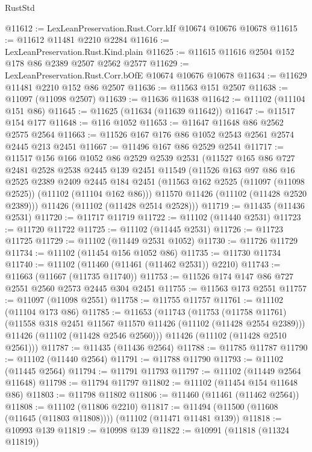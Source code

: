 \begin{lexlean}{RustStd}
\begin{coremodule}
@11612 := LexLeanPreservation.Rust.Corr.kIf @10674 @10676 @10678
@11615 := @11612 @11481 @2210 @2284
@11616 := LexLeanPreservation.Rust.Kind.plain
@11625 := @11615 @11616 @2504 @152 @178 @86 @2389 @2507 @2562 @2577
@11629 := LexLeanPreservation.Rust.Corr.bOfE @10674 @10676 @10678
@11634 := @11629 @11481 @2210 @152 @86 @2507
@11636 := @11563 @151 @2507
@11638 := @11097 (@11098 @2507)
@11639 := @11636 @11638
@11642 := @11102 (@11104 @151 @86)
@11645 := @11625 (@11634 (@11639 @11642))
@11647 := @11517 @154 @177
@11648 := @116 @1052
@11653 := @11647 @11648 @86 @2562 @2575 @2564
@11663 := @11526 @167 @176 @86 @1052 @2543 @2561 @2574 @2445 @213 @2451
@11667 := @11496 @167 @86 @2529 @2541
@11717 := @11517
    @156
    @166
    @1052
    @86
    @2529
    @2539
    @2531
    (@11527
      @165
      @86
      @727
      @2481
      @2528
      @2538
      @2445
      @139
      @2451
      @11549
      (@11526
        @163
        @97
        @86
        @16
        @2525
        @2389
        @2409
        @2445
        @184
        @2451
        (@11563 @162 @2525 (@11097 (@11098 @2525)) (@11102 (@11104 @162 @86)))
        @11570
        @11426
        (@11102 (@11428 @2520 @2389)))
      @11426
      (@11102 (@11428 @2514 @2528)))
@11719 := @11435 (@11436 @2531)
@11720 := @11717 @11719
@11722 := @11102 (@11440 @2531)
@11723 := @11720 @11722
@11725 := @11102 (@11445 @2531)
@11726 := @11723 @11725
@11729 := @11102 (@11449 @2531 @1052)
@11730 := @11726 @11729
@11734 := @11102 (@11454 @156 @1052 @86)
@11735 := @11730 @11734
@11740 := @11102 (@11460 (@11461 (@11462 @2531)) @2210)
@11743 := @11663 (@11667 (@11735 @11740))
@11753 := @11526 @174 @147 @86 @727 @2551 @2560 @2573 @2445 @304 @2451
@11755 := @11563 @173 @2551
@11757 := @11097 (@11098 @2551)
@11758 := @11755 @11757
@11761 := @11102 (@11104 @173 @86)
@11785 := @11653
    (@11743
      (@11753
        (@11758 @11761)
        (@11558 @318 @2451 @11567 @11570 @11426 (@11102 (@11428 @2554 @2389)))
        @11426
        (@11102 (@11428 @2546 @2560)))
      @11426
      (@11102 (@11428 @2510 @2561)))
@11787 := @11435 (@11436 @2564)
@11788 := @11785 @11787
@11790 := @11102 (@11440 @2564)
@11791 := @11788 @11790
@11793 := @11102 (@11445 @2564)
@11794 := @11791 @11793
@11797 := @11102 (@11449 @2564 @11648)
@11798 := @11794 @11797
@11802 := @11102 (@11454 @154 @11648 @86)
@11803 := @11798 @11802
@11806 := @11460 (@11461 (@11462 @2564))
@11808 := @11102 (@11806 @2210)
@11817 := @11494 (@11500 (@11608 (@11645 (@11803 @11808)))) (@11102 (@11471 @11481 @139))
@11818 := @10993 @139
@11819 := @10998 @139
@11822 := @10991 (@11818 (@11324 @11819))

\end{coremodule}
\end{lexlean}
